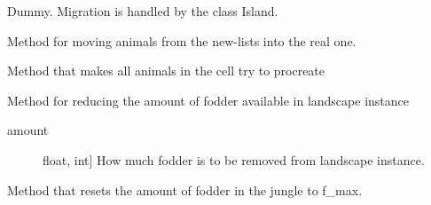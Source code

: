\documentclass[a4paper,10pt,english]{sphinxmanual}
\begin{document}
\begin{fulllineitems}
\begin{fulllineitems}
\end{fulllineitems}


\begin{fulllineitems}
\label{\detokenize{landscape:biosim.landscape.Jungle.migration}}
Dummy. Migration is handled by the class Island.

\end{fulllineitems}


\begin{fulllineitems}
\label{\detokenize{landscape:biosim.landscape.Jungle.move_new_animals}}
Method for moving animals from the new-lists into the real one.

\end{fulllineitems}


\begin{fulllineitems}
\label{\detokenize{landscape:biosim.landscape.Jungle.procreation}}
Method that makes all animals in the cell try to procreate

\end{fulllineitems}


\begin{fulllineitems}
\label{\detokenize{landscape:biosim.landscape.Jungle.reduce_fodder}}
Method for reducing the amount of fodder available in landscape instance
\begin{description}
\item[{amount}] \leavevmode{[}float, int{]}
How much fodder is to be removed from landscape instance.

\end{description}

\end{fulllineitems}


\begin{fulllineitems}
\label{\detokenize{landscape:biosim.landscape.Jungle.reset_fodder}}
Method that resets the amount of fodder in the jungle to f\_max.


\end{fulllineitems}
\end{fulllineitems}
\end{document}
